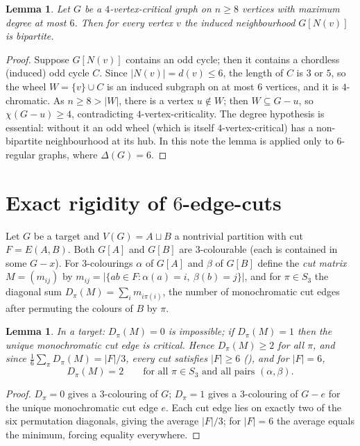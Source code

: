 \documentclass[11pt]{article}
\newtheorem{lemma}[theorem]{Lemma}
\theoremstyle{remark}
\begin{document}
\begin{lemma}\label{lem:nbhd}
Let $G$ be a $4$-vertex-critical graph on $n\ge 8$ vertices with maximum degree at
most $6$. Then for every vertex $v$ the induced neighbourhood $G[N(v)]$ is bipartite.
\end{lemma}

\begin{proof}
Suppose $G[N(v)]$ contains an odd cycle; then it contains a chordless (induced) odd
cycle $C$. Since $|N(v)|=d(v)\le 6$, the length of $C$ is $3$ or $5$, so the wheel
$W=\{v\}\cup C$ is an induced subgraph on at most $6$ vertices, and it is
$4$-chromatic. As $n\ge 8>|W|$, there is a vertex $u\notin W$; then $W\subseteq G-u$,
so $\chi(G-u)\ge 4$, contradicting $4$-vertex-criticality.
The degree hypothesis is essential: without it an odd wheel (which is itself
$4$-vertex-critical) has a non-bipartite neighbourhood at its hub. In this note the
lemma is applied only to $6$-regular graphs, where $\Delta(G)=6$.
\end{proof}

\section{Exact rigidity of $6$-edge-cuts}\label{sec:cuts}

Let $G$ be a target and $V(G)=A\sqcup B$ a nontrivial partition with cut
$F=E(A,B)$. Both $G[A]$ and $G[B]$ are $3$-colourable (each is contained in some
$G-x$). For $3$-colourings $\alpha$ of $G[A]$ and $\beta$ of $G[B]$ define the
\emph{cut matrix} $M=(m_{ij})$ by
$m_{ij}=|\{ab\in F:\alpha(a)=i,\ \beta(b)=j\}|$, and for $\pi\in S_3$ the diagonal
sum $D_\pi(M)=\sum_i m_{i\pi(i)}$, the number of monochromatic cut edges after
permuting the colours of $B$ by $\pi$.

\begin{lemma}\label{lem:Dpi}
In a target: $D_\pi(M)=0$ is impossible; if $D_\pi(M)=1$ then the unique
monochromatic cut edge is critical. Hence $D_\pi(M)\ge 2$ for all $\pi$, and since
$\tfrac16\sum_{\pi}D_\pi(M)=|F|/3$, every cut satisfies $|F|\ge 6$
\textup{(\cite[Prop.~5.1]{SkSt25})}, and for $|F|=6$,
\[
D_\pi(M)=2\qquad\text{for all }\pi\in S_3\text{ and all pairs }(\alpha,\beta).
\]
\end{lemma}

\begin{proof}
$D_\pi=0$ gives a $3$-colouring of $G$; $D_\pi=1$ gives a $3$-colouring of $G-e$
for the unique monochromatic cut edge $e$. Each cut edge lies on exactly two of
the six permutation diagonals, giving the average $|F|/3$; for $|F|=6$ the average
equals the minimum, forcing equality everywhere.
\end{proof}
\end{document}
